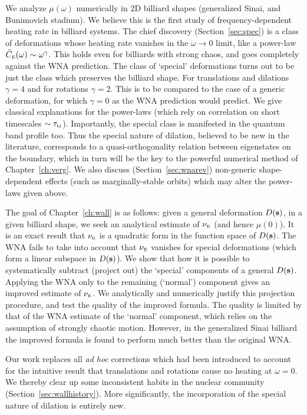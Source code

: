 We analyze $\mu(\omega)$ numerically in 2D billiard shapes (generalized Sinai,
and Bunimovich stadium). We believe this is the first study of frequency-dependent
heating rate in billiard systems.
The chief discovery (Section~\ref{sec:spec})
is a class of deformations whose heating rate
vanishes in the $\omega\rightarrow0$
limit, like a power-law $\tilde{C}_{\mbox{\tiny E}}(\omega) \sim \omega^\gamma$.
This holds even for billiards with strong chaos,
and goes completely against the WNA prediction.
The class of `special' deformations
turns out to be just the class which preserves the billiard shape.
For translations and dilations $\gamma = 4$ and for rotations $\gamma = 2$.
This is to be compared to the case of a generic deformation, for which
$\gamma = 0$ as the WNA prediction would predict.
We give classical explanations for the power-laws (which
rely on correlation on short timescales $\sim \tau_{\mbox{\tiny bl}}$).
Importantly, the special class is manifested in the quantum band profile too.
Thus the special nature of dilation, believed to be new in the literature,
corresponds to a quasi-orthogonality relation between
eigenstates on the boundary,
which in turn will be the key to the powerful
numerical method of Chapter~\ref{ch:verg}.
We also discuss (Section~\ref{sec:wnarev}) non-generic shape-dependent
effects (such as marginally-stable orbits) which may alter the power-laws
given above.

The goal of Chapter~\ref{ch:wall} is as follows:
given a general deformation $D{({\mathbf s})}$, in a given billiard shape,
we seek an analytical estimate of $\nu_{\mbox{\tiny E}}$ (and hence
$\mu(0)$). It is an exact result that $\nu_{\mbox{\tiny E}}$ is a quadratic form in
the function space of $D{({\mathbf s})}$.
The WNA
fails to take into account that $\nu_{\mbox{\tiny E}}$ vanishes for special deformations
(which form a linear subspace in $D{({\mathbf s})}$).
We show that how it is possible to systematically subtract
(project out) the `special' components of a general $D{({\mathbf s})}$.
Applying the WNA only to the remaining (`normal') component
gives an improved estimate of $\nu_{\mbox{\tiny E}}$.
We analytically and numerically justify this projection procedure, and test
the quality of the improved formula.
The quality is limited by that of the WNA estimate of the `normal' component,
which relies on the assumption of strongly chaotic motion.
However, in the generalized Sinai billiard
the improved formula is found to perform much better than the original WNA.

Our work replaces all {\em ad hoc} corrections which had been introduced \cite{wall}
to account for the intuitive result that translations and rotations cause no heating
at $\omega=0$.
We thereby clear up some inconsistent habits in the nuclear community
(Section~\ref{sec:wallhistory}).
More significantly,
the incorporation of the special nature of dilation is entirely new.

